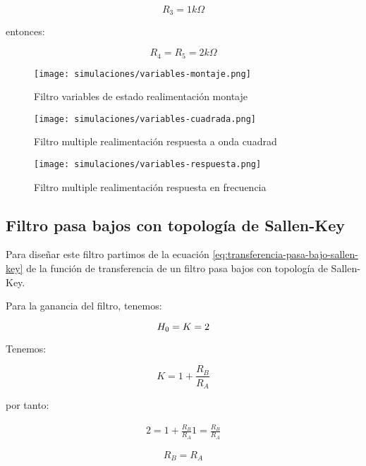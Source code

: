 $$\boxed{R_3 = 1k\Omega}$$

entonces:

\begin{equation*}
    \boxed{R_4 = R_5 = 2k\Omega}
\end{equation*}


\begin{figure}[ht]
    \centering
    \texttt{[image: simulaciones/variables-montaje.png]}
    \caption{Filtro variables de estado realimentación montaje}\label{fig:sim-variables-montaje} 
\end{figure}

\begin{figure}[ht]
    \centering
    \texttt{[image: simulaciones/variables-cuadrada.png]}
    \caption{Filtro multiple realimentación respuesta a onda cuadrad  }
    \label{fig:sim-variables-cuadrada} 
\end{figure}

\begin{figure}[ht]
    \centering
    \texttt{[image: simulaciones/variables-respuesta.png]}
    \caption{Filtro multiple realimentación respuesta en frecuencia  }
\end{figure}

\subsection{Filtro pasa bajos con topología de Sallen-Key}

Para diseñar este filtro partimos de la ecuación \ref{eq:transferencia-pasa-bajo-sallen-key} de la función de transferencia de un filtro pasa bajos con topología de Sallen-Key.

Para la ganancia del filtro, tenemos:

\begin{equation*}
    H_0 = K = 2
\end{equation*}

Tenemos:

\begin{equation}
    K = 1 + \frac{R_B}{R_A}
\end{equation}

por tanto:

\begin{align*}
    2 = 1 + \frac{R_B}{R_A}
    1 = \frac{R_B}{R_A}
\end{align*}

\begin{equation*}
    \boxed{R_B = R_A}
\end{equation*}

